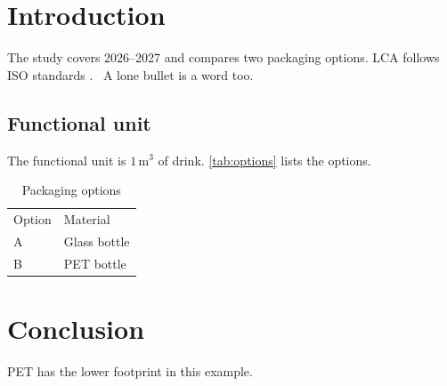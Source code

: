 

\tableofcontents

\section{Introduction}


The study covers 2026--2027 and compares two packaging options.
LCA follows ISO standards \cite{debruijnHandbookLifeCycle2002a}.
\textbullet\ A lone bullet is a word too.

\subsection{Functional unit}

The functional unit is $1\,\mathrm{m^3}$ of drink.
\autoref{tab:options} lists the options.

\begin{table}[h]
    \caption{Packaging options}
  \label{tab:options}
    \begin{tabular}{ll}
    \hline
    Option & Material \\
    A & Glass bottle \\
    B & PET bottle \\
    \hline
  \end{tabular}
\end{table}

\section{Conclusion}

PET has the lower footprint in this example.

\printbibliography
